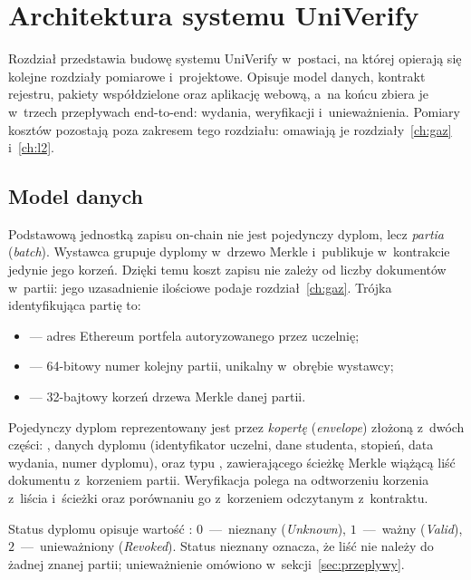 \chapter{Architektura systemu UniVerify}
\label{ch:architektura}

Rozdział przedstawia budowę systemu UniVerify w~postaci, na której opierają się
kolejne rozdziały pomiarowe i~projektowe. Opisuje model danych, kontrakt rejestru,
pakiety współdzielone oraz aplikację webową, a~na końcu zbiera je w~trzech
przepływach end-to-end: wydania, weryfikacji i~unieważnienia. Pomiary kosztów pozostają
poza zakresem tego rozdziału: omawiają je rozdziały~\ref{ch:gaz} i~\ref{ch:l2}.

\section{Model danych}
\label{sec:model-danych}

Podstawową jednostką zapisu on-chain nie jest pojedynczy dyplom, lecz \emph{partia}
(\emph{batch}). Wystawca grupuje dyplomy w~drzewo Merkle i~publikuje w~kontrakcie
jedynie jego korzeń. Dzięki temu koszt zapisu nie zależy od liczby dokumentów
w~partii: jego uzasadnienie ilościowe podaje rozdział~\ref{ch:gaz}. Trójka
identyfikująca partię to:

\begin{itemize}
  \item {} --- adres Ethereum portfela autoryzowanego przez uczelnię;
  \item {} --- 64-bitowy numer kolejny partii, unikalny w~obrębie
        wystawcy;
  \item {} --- 32-bajtowy korzeń drzewa Merkle danej partii.
\end{itemize}

Pojedynczy dyplom reprezentowany jest przez \emph{kopertę}
(\emph{envelope}) złożoną z~dwóch części: , danych dyplomu
(identyfikator uczelni, dane studenta, stopień, data wydania, numer dyplomu),
oraz  typu , zawierającego ścieżkę Merkle wiążącą
liść dokumentu z~korzeniem partii. Weryfikacja polega na odtworzeniu korzenia
z~liścia i~ścieżki oraz porównaniu go z~korzeniem odczytanym z~kontraktu.

Status dyplomu opisuje wartość : $0$~---~nieznany
(\emph{Unknown}), $1$~---~ważny (\emph{Valid}), $2$~---~unieważniony
(\emph{Revoked}). Status nieznany oznacza, że liść nie należy do żadnej znanej
partii; unieważnienie omówiono w~sekcji~\ref{sec:przeplywy}.

